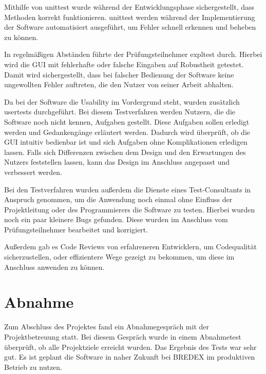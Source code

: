 \documentclass[11pt]{article}
\begin{document}
Mithilfe von \gls{unittest} wurde während der Entwicklungsphase sichergestellt, dass Methoden korrekt funktionieren.
\gls{unittest} werden während der Implementierung der Software automatisiert ausgeführt, um Fehler schnell erkennen und beheben 
zu können.

In regelmäßigen Abständen führte der Prüfungsteilnehmer \gls{expltest} durch. Hierbei wird die GUI mit fehlerhafte oder falsche
Eingaben auf Robustheit getestet. Damit wird sichergestellt, dass bei falscher Bedienung der Software keine ungewollten
Fehler auftreten, die den Nutzer von seiner Arbeit abhalten. 

Da bei der Software die Usability im Vordergrund steht, wurden zusätzlich \glspl{usertest} durchgeführt. Bei diesem Testverfahren werden Nutzern, die
die Software noch nicht kennen, Aufgaben gestellt. Diese Aufgaben sollen erledigt werden und Gedankengänge erläutert werden. Dadurch wird überprüft, 
ob die GUI intuitiv bedienbar ist und sich Aufgaben ohne Komplikationen erledigen lassen. Falls sich Differenzen zwischen dem Design und den Erwartungen des Nutzers
feststellen lassen, kann das Design im Anschluss angepasst und verbessert werden.

Bei den Testverfahren wurden außerdem die Dienste eines Test-Consultants in Anspruch genommen, um die Anwendung noch einmal
ohne Einfluss der Projektleitung oder des Programmierers die Software zu testen. Hierbei wurden noch ein paar kleinere Bugs gefunden.
Diese wurden im Anschluss vom Prüfungsteilnehmer bearbeitet und korrigiert.

Außerdem gab es Code Reviews von erfahreneren Entwicklern, um Codequalität sicherzustellen, oder effizientere Wege gezeigt zu bekommen,
um diese im Anschluss anwenden zu können.


%
%

\section{Abnahme}
Zum Abschluss des Projektes fand ein Abnahmegespräch mit der Projektbetreuung statt. Bei diesem
Gespräch wurde in einem Abnahmetest überprüft, ob alle Projektziele erreicht wurden.
Das Ergebnis des Tests war sehr gut.
Es ist geplant die Software in naher Zukunft bei BREDEX im produktiven 
Betrieb zu nutzen.
\end{document}
